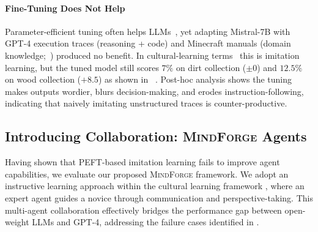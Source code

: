 \documentclass{article}
\newcommand{\collabvoyager}[0]{\mbox{\textsc{MindForge}}\xspace}
\begin{document}
\paragraph{Fine-Tuning Does Not Help}
Parameter-efficient tuning often helps LLMs~\citep{han2024parameter}, yet adapting Mistral-7B with GPT-4 execution traces (reasoning + code) and Minecraft manuals (domain knowledge;~) produced no benefit. In cultural-learning terms~\citep{tomasello1993cultural, tomasello2016cultural} this is imitation learning, but the tuned model still scores $7\%$ on dirt collection ($\pm0$) and $12.5\%$ on wood collection ($+8.5$) as shown in ~. Post-hoc analysis shows the tuning makes outputs wordier, blurs decision-making, and erodes instruction-following, indicating that naively imitating unstructured traces is counter-productive.


\subsection{Introducing Collaboration: \collabvoyager Agents}
\label{ssec:collab}
Having shown that PEFT-based imitation learning fails to improve agent capabilities, we evaluate our proposed \collabvoyager framework. We adopt an instructive learning approach within the cultural learning framework \citep{tomasello2016cultural}, where an expert agent guides a novice through communication and perspective-taking. This multi-agent collaboration effectively bridges the performance gap between open-weight LLMs and GPT-4, addressing the failure cases identified in .
\end{document}

